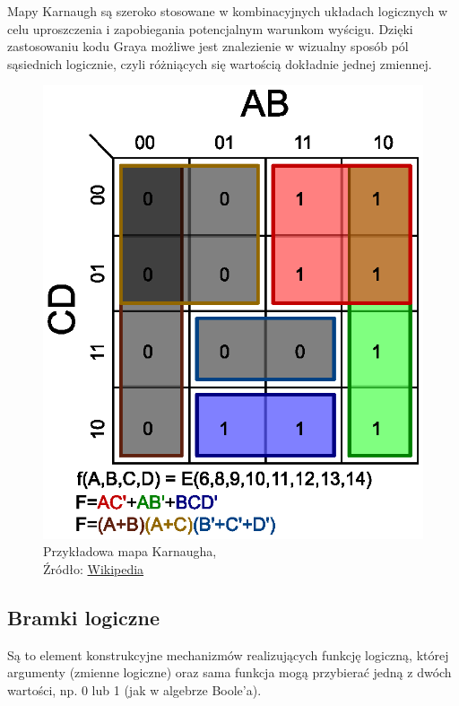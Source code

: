 \documentclass{article}
\begin{document}
    Mapy Karnaugh są szeroko stosowane w kombinacyjnych układach logicznych w celu uproszczenia i zapobiegania potencjalnym warunkom wyścigu. Dzięki zastosowaniu kodu Graya możliwe jest znalezienie w wizualny sposób pól sąsiednich logicznie, czyli różniących się wartością dokładnie jednej zmiennej.
      \begin{figure}[!ht]
        \centering
        \includegraphics[scale=0.55]{grafiki/K-map.eps}
        \caption{Przykładowa mapa Karnaugha,
        \\Źródło: \href{https://en.m.wikipedia.org/wiki/File:K-map_6,8,9,10,11,12,13,14.svg}{Wikipedia}}
      \end{figure}
    
    \subsection{Bramki logiczne}
      Są to element konstrukcyjne mechanizmów realizujących funkcję logiczną, której argumenty (zmienne logiczne) oraz sama funkcja mogą przybierać jedną z dwóch wartości, np. 0 lub 1 (jak w algebrze Boole'a).
\end{document}
